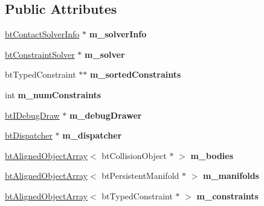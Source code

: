 \subsection*{Public Attributes}
\begin{DoxyCompactItemize}
\item 
\mbox{\label{structInplaceSolverIslandCallback_a011d245b40b039e0d35b47096bc18aff}} 
\hyperlink{structbtContactSolverInfo}{bt\+Contact\+Solver\+Info} $\ast$ {\bfseries m\+\_\+solver\+Info}
\item 
\mbox{\label{structInplaceSolverIslandCallback_a56e47f4b0b36906338ceb293b928b61c}} 
\hyperlink{classbtConstraintSolver}{bt\+Constraint\+Solver} $\ast$ {\bfseries m\+\_\+solver}
\item 
\mbox{\label{structInplaceSolverIslandCallback_ab1cb91d3f29d4db3d57852aa09f21d5b}} 
bt\+Typed\+Constraint $\ast$$\ast$ {\bfseries m\+\_\+sorted\+Constraints}
\item 
\mbox{\label{structInplaceSolverIslandCallback_ad007fd73d8c62c11f37da40bc1a7319d}} 
int {\bfseries m\+\_\+num\+Constraints}
\item 
\mbox{\label{structInplaceSolverIslandCallback_a86d6ebb3a4c1a9130d5cec8cf5418bd1}} 
\hyperlink{classbtIDebugDraw}{bt\+I\+Debug\+Draw} $\ast$ {\bfseries m\+\_\+debug\+Drawer}
\item 
\mbox{\label{structInplaceSolverIslandCallback_a55571e8607e297961931e9277378cf34}} 
\hyperlink{classbtDispatcher}{bt\+Dispatcher} $\ast$ {\bfseries m\+\_\+dispatcher}
\item 
\mbox{\label{structInplaceSolverIslandCallback_a08cd78f93e9146ae01e86fad0a95cea0}} 
\hyperlink{classbtAlignedObjectArray}{bt\+Aligned\+Object\+Array}$<$ bt\+Collision\+Object $\ast$ $>$ {\bfseries m\+\_\+bodies}
\item 
\mbox{\label{structInplaceSolverIslandCallback_a9c72fb9ee0542a76e891b0e8fc49eb11}} 
\hyperlink{classbtAlignedObjectArray}{bt\+Aligned\+Object\+Array}$<$ bt\+Persistent\+Manifold $\ast$ $>$ {\bfseries m\+\_\+manifolds}
\item 
\mbox{\label{structInplaceSolverIslandCallback_a20c5faa098ec5a52cb2a7cc64278809f}} 
\hyperlink{classbtAlignedObjectArray}{bt\+Aligned\+Object\+Array}$<$ bt\+Typed\+Constraint $\ast$ $>$ {\bfseries m\+\_\+constraints}
\end{DoxyCompactItemize}


